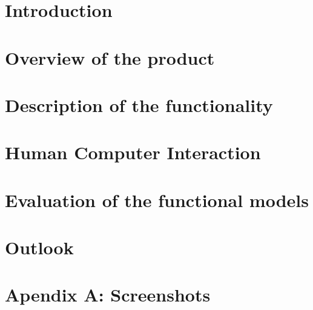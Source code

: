 \documentclass[a4paper]{article}
\begin{document}
	
	
	
	\clearpage
	
	\tableofcontents
	\clearpage
	
	\section{Introduction}
	
	
	\section{Overview of the product}
	
		
	\section{Description of the functionality}
	
		
	\section{Human Computer Interaction}
	
		
	\section{Evaluation of the functional models}
	
		
	\section{Outlook}
	
	
	\section{Apendix A: Screenshots}
	
	
	\clearpage
	{}
	
	
\end{document}
